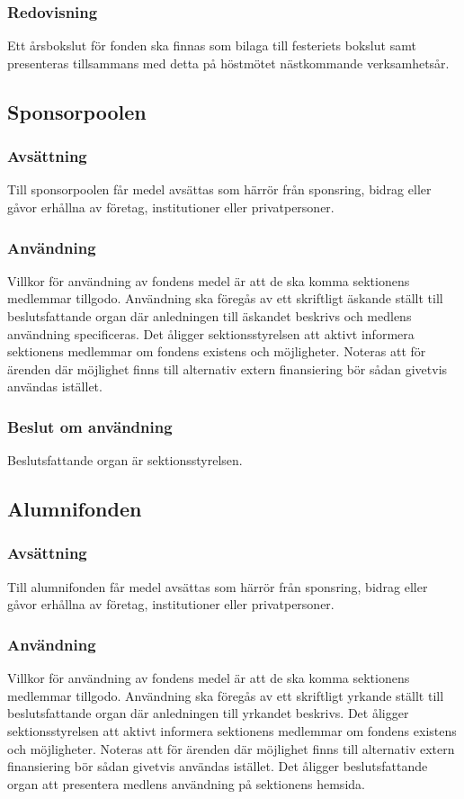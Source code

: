 \documentclass{datateknologsektionen-document}
\begin{document}
\subsubsection{Redovisning}
Ett årsbokslut för fonden ska finnas som bilaga till festeriets bokslut samt presenteras
tillsammans med detta på höstmötet nästkommande verksamhetsår.
\subsection{Sponsorpoolen}
\subsubsection{Avsättning}
Till sponsorpoolen får medel avsättas som härrör från sponsring, bidrag eller gåvor erhållna av
företag, institutioner eller privatpersoner.
\subsubsection{Användning}
Villkor för användning av fondens medel är att de ska komma sektionens
medlemmar tillgodo. Användning ska föregås av ett skriftligt äskande ställt till beslutsfattande
organ där anledningen till äskandet beskrivs och medlens användning specificeras. Det åligger
sektionsstyrelsen att aktivt informera sektionens medlemmar om
fondens existens och möjligheter. Noteras att för ärenden där möjlighet finns till alternativ
extern finansiering bör sådan givetvis användas istället.
\subsubsection{Beslut om användning}
Beslutsfattande organ är sektionsstyrelsen.
\subsection{Alumnifonden}
\subsubsection{Avsättning}
Till alumnifonden får medel avsättas som härrör från sponsring, bidrag eller gåvor erhållna av
företag, institutioner eller privatpersoner.
\subsubsection{Användning}
Villkor för användning av fondens medel är att de ska komma sektionens
medlemmar tillgodo. Användning ska föregås av ett skriftligt yrkande ställt till beslutsfattande
organ där anledningen till yrkandet beskrivs. Det åligger sektionsstyrelsen att
aktivt informera sektionens medlemmar om fondens existens och möjligheter.
Noteras att för ärenden där möjlighet finns till alternativ extern finansiering bör sådan givetvis
användas istället. Det åligger beslutsfattande organ att presentera medlens användning på
sektionens hemsida.
\end{document}

